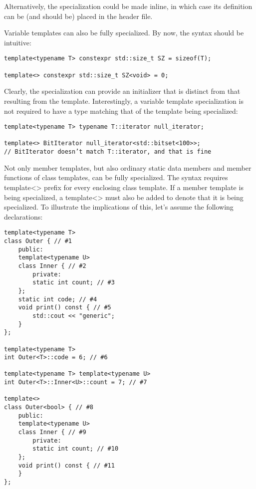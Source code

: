 Alternatively, the specialization could be made inline, in which case its definition can be (and should be) placed in the header file.


Variable templates can also be fully specialized. By now, the syntax should be intuitive:

\begin{lstlisting}[style=styleCXX]
template<typename T> constexpr std::size_t SZ = sizeof(T);

template<> constexpr std::size_t SZ<void> = 0;
\end{lstlisting}

Clearly, the specialization can provide an initializer that is distinct from that resulting from the template. Interestingly, a variable template specialization is not required to have a type matching that of the template being specialized:

\begin{lstlisting}[style=styleCXX]
template<typename T> typename T::iterator null_iterator;

template<> BitIterator null_iterator<std::bitset<100>>;
// BitIterator doesn’t match T::iterator, and that is fine
\end{lstlisting}


Not only member templates, but also ordinary static data members and member functions of class templates, can be fully specialized. The syntax requires template<> prefix for every enclosing class template. If a member template is being specialized, a template<> must also be added to denote that it is being specialized. To illustrate the implications of this, let’s assume the following declarations:

\begin{lstlisting}[style=styleCXX]
template<typename T>
class Outer { // #1
	public:
	template<typename U>
	class Inner { // #2
		private:
		static int count; // #3
	};
	static int code; // #4
	void print() const { // #5
		std::cout << "generic";
	}
};

template<typename T>
int Outer<T>::code = 6; // #6

template<typename T> template<typename U>
int Outer<T>::Inner<U>::count = 7; // #7

template<>
class Outer<bool> { // #8
	public:
	template<typename U>
	class Inner { // #9
		private:
		static int count; // #10
	};
	void print() const { // #11
	}
};
\end{lstlisting}

